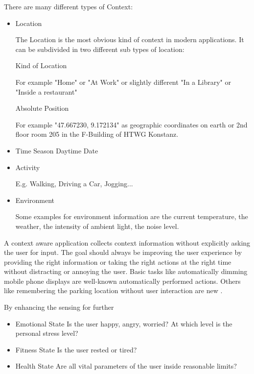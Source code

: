 There are many different types of Context: 

\begin{itemize}
\item Location

The Location is the most obvious kind of context in modern applications. It can be subdivided in two different sub types of location: 

\subitem Kind of Location

For example "Home" or "At Work" or slightly different "In a Library" or "Inside a restaurant"

\subitem Absolute Position

For example "47.667230, 9.172134" as geographic coordinates on earth or 2nd floor room 205 in the F-Building of HTWG Konstanz.

\item Time
\subitem Season
\subitem Daytime
\subitem Date
\item Activity

E.g. Walking, Driving a Car, Jogging...
\item Environment

Some examples for environment information are the current temperature, the weather, the intensity of ambient light, the noise level.
\end{itemize}

A context aware application collects context information without explicitly asking the user for input. The goal should always be improving the user experience by providing the right information or taking the right actions at the right time without distracting or annoying the user. 
Basic tasks like automatically dimming mobile phone displays are well-known automatically performed actions. Others like remembering the parking location without user interaction are new .

By enhancing the sensing for further 

\begin{itemize}
\item Emotional State
Is the user happy, angry, worried? At which level is the personal stress level?
\item Fitness State
Is the user rested or tired?
\item Health State
Are all vital parameters of the user inside reasonable limits?
\end{itemize}




